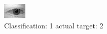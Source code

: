 \begin{figure}[h!]
\begin{center}
\includegraphics[width=0.60\columnwidth]{figures/ID444_class_1_target_2.png}
\end{center}
\caption{ Classification: 1 actual target: 2}
\label{fig:ID444_class_1_target_2}
\end{figure}
